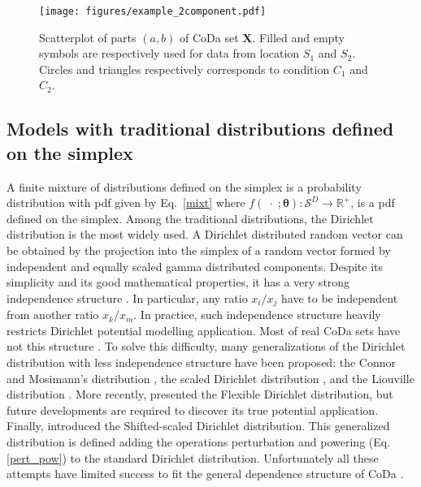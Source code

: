\documentclass[12pt, a4paper]{article}
\newcommand{\m}[1]{\boldsymbol{#1}}
\begin{document}
\begin{figure}[thbp]
\centering
\texttt{[image: figures/example\_2component.pdf]}
\caption{Scatterplot of parts $(a,b)$ of CoDa set $\mathbf{X}$. Filled and empty symbols are respectively used for
data from location $S_1$ and $S_2$. Circles and triangles respectively corresponds to condition
$C_1$ and $C_2$.}\label{example_elim_2_components}
\end{figure}

\subsection{Models with traditional distributions defined on the simplex}
\label{simplex_section}

\noindent A finite mixture of distributions defined on the simplex is a probability distribution with pdf given by Eq.~\ref{mixt} where $f(\;\cdot\;;\m\theta): \mathcal{S}^D \rightarrow \mathbb{R}^+$, is a pdf defined on the simplex. Among the traditional distributions, the Dirichlet distribution is the most widely used. A Dirichlet distributed random vector can be obtained by the projection into the simplex of a random vector formed by independent and equally scaled gamma distributed components. 
Despite its simplicity and its good mathematical properties, it has a very strong independence structure \citep{aitchison1986statistical}. In particular, any ratio $x_i/x_j$ have to be independent from another
ratio $x_k/x_m$. In practice, such independence structure heavily restricts Dirichlet potential modelling application. Most of real CoDa sets have not this structure \citep{aitchison1986statistical}. To solve this difficulty, many generalizations of the Dirichlet distribution with less independence structure have been proposed: the Connor and Mosimann's distribution
\citep{connor1969concepts}, the scaled Dirichlet distribution \citep{aitchison1986statistical},  and the Liouville distribution \citep{rayens1994dependence}.  More recently, \cite{ongaro2008new} presented the Flexible Dirichlet distribution, but future
developments are required to discover its true potential application. Finally, \cite{monti2011shifted} introduced the Shifted-scaled Dirichlet distribution. This generalized distribution is defined adding the operations
perturbation and powering (Eq. \ref{pert_pow}) to the standard Dirichlet distribution. Unfortunately all these attempts
have limited success to fit the general dependence structure of CoDa \citep{mateu2013normal}.
\end{document}
